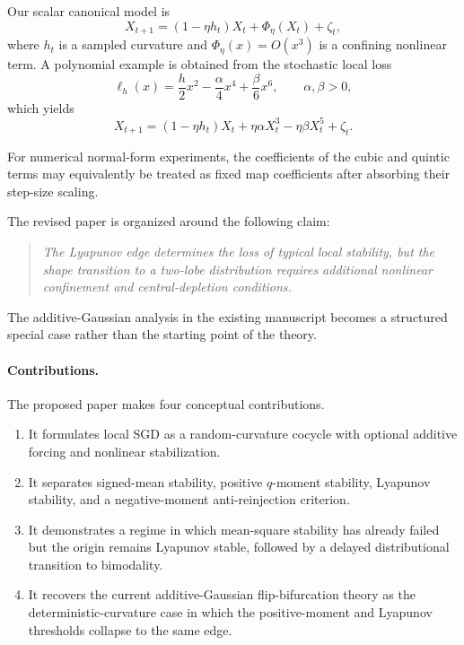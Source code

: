 \documentclass[11pt]{article}
\begin{document}
Our scalar canonical model is
\begin{equation}
 X_{t+1}=(1-\eta h_t)X_t+\Phi_\eta(X_t)+\zeta_t,
 \label{eq:scalarcanonical}
\end{equation}
where $h_t$ is a sampled curvature and $\Phi_\eta(x)=O(x^3)$ is a confining nonlinear term.  A polynomial example is obtained from the stochastic local loss
\begin{equation}
 \ell_h(x)=\frac{h}{2}x^2-\frac{\alpha}{4}x^4+\frac{\beta}{6}x^6,
 \qquad \alpha,\beta>0,
\end{equation}
which yields
\begin{equation}
 X_{t+1}=(1-\eta h_t)X_t+\eta\alpha X_t^3-\eta\beta X_t^5+\zeta_t.
 \label{eq:polynomialsgd}
\end{equation}


For numerical normal-form experiments, the coefficients of the cubic and quintic terms may equivalently be treated as fixed map coefficients after absorbing their step-size scaling.

The revised paper is organized around the following claim:
\begin{quote}
\emph{The Lyapunov edge determines the loss of typical local stability, but the shape transition to a two-lobe distribution requires additional nonlinear confinement and central-depletion conditions.}
\end{quote}
The additive-Gaussian analysis in the existing manuscript becomes a structured special case rather than the starting point of the theory.

\paragraph{Contributions.}
The proposed paper makes four conceptual contributions.
\begin{enumerate}[leftmargin=1.6em,itemsep=0.25em]
    \item It formulates local SGD as a random-curvature cocycle with optional additive forcing and nonlinear stabilization.
    \item It separates signed-mean stability, positive $q$-moment stability, Lyapunov stability, and a negative-moment anti-reinjection criterion.
    \item It demonstrates a regime in which mean-square stability has already failed but the origin remains Lyapunov stable, followed by a delayed distributional transition to bimodality.
    \item It recovers the current additive-Gaussian flip-bifurcation theory as the deterministic-curvature case in which the positive-moment and Lyapunov thresholds collapse to the same edge.
\end{enumerate}
\end{document}
